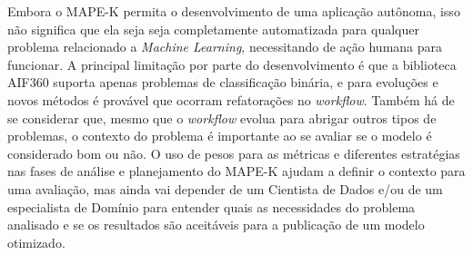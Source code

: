 \documentclass[twocolumn]{article}
\begin{document}
Embora o MAPE-K permita o desenvolvimento de uma aplicação autônoma, isso não significa que ela seja seja completamente automatizada para qualquer problema relacionado a \textit{Machine Learning}, necessitando de ação humana para funcionar. A principal limitação por parte do desenvolvimento é que a biblioteca AIF360 suporta apenas problemas de classificação binária, e para evoluções e novos métodos é provável que ocorram refatorações no \textit{workflow}. Também há de se considerar que, mesmo que o \textit{workflow} evolua para abrigar outros tipos de problemas, o contexto do problema é importante ao se avaliar se o modelo é considerado bom ou não. O uso de pesos para as métricas e diferentes estratégias nas fases de análise e planejamento do MAPE-K ajudam a definir o contexto para uma avaliação, mas ainda vai depender de um Cientista de Dados e/ou de um especialista de Domínio para entender quais as necessidades do problema analisado e se os resultados são aceitáveis para a publicação de um modelo otimizado.



\end{document}

